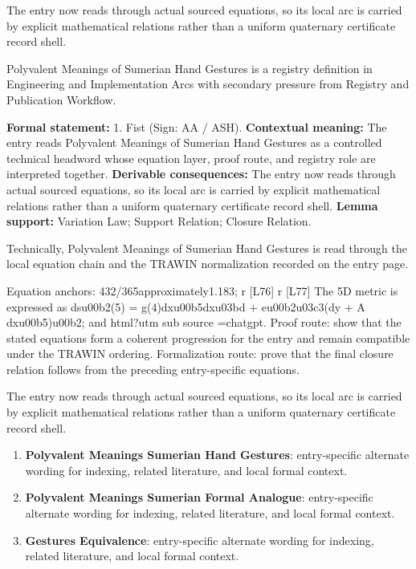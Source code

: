 The entry now reads through actual sourced equations, so its local arc is carried by explicit mathematical relations rather than a uniform quaternary certificate record shell.
\clearpage


\begingroup\small
{}
Polyvalent Meanings of Sumerian Hand Gestures is a registry definition in Engineering and Implementation Arcs with secondary pressure from Registry and Publication Workflow.

\begingroup\footnotesize\setlength{\emergencystretch}{3em}\sloppy
\textbf{Formal statement:} 1. Fist (Sign: AA / ASH). \textbf{Contextual meaning:} The entry reads Polyvalent Meanings of Sumerian Hand Gestures as a controlled technical headword whose equation layer, proof route, and registry role are interpreted together. \textbf{Derivable consequences:} The entry now reads through actual sourced equations, so its local arc is carried by explicit mathematical relations rather than a uniform quaternary certificate record shell. \textbf{Lemma support:} Variation Law; Support Relation; Closure Relation.\par
\endgroup

Technically, Polyvalent Meanings of Sumerian Hand Gestures is read through the local equation chain and the TRAWIN normalization recorded on the entry page.

Equation anchors: 432/365approximately1.183; r [L76] r [L77] The 5D metric is expressed as dsu00b2(5) = g(4)dxu00b5dxu03bd + eu00b2u03c3(dy + A dxu00b5)u00b2; and html?utm sub source =chatgpt. Proof route: show that the stated equations form a coherent progression for the entry and remain compatible under the TRAWIN ordering. Formalization route: prove that the final closure relation follows from the preceding entry-specific equations.

The entry now reads through actual sourced equations, so its local arc is carried by explicit mathematical relations rather than a uniform quaternary certificate record shell.
\endgroup

\begin{enumerate}[leftmargin=1.6em,itemsep=6pt,topsep=4pt]
\item \textbf{Polyvalent Meanings Sumerian Hand Gestures}: entry-specific alternate wording for indexing, related literature, and local formal context.
\item \textbf{Polyvalent Meanings Sumerian Formal Analogue}: entry-specific alternate wording for indexing, related literature, and local formal context.
\item \textbf{Gestures Equivalence}: entry-specific alternate wording for indexing, related literature, and local formal context.
\end{enumerate}

